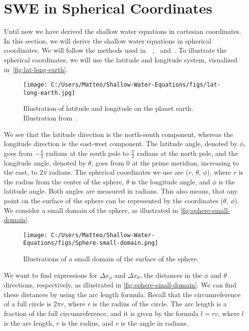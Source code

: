 \section{SWE in Spherical Coordinates}
Until now we have derived the shallow water equations in cartesian coordinates.
In this section, we will derive the shallow water equations in spherical coordinates.
We will follow the methods used in~\cite{Castro2017}~\cite{Bihlo2022},~\cite{Raymond} and~\cite{Gill_1982}.
To illustrate the spherical coordinates, we will use the latitude and longitude system, visualized in~\autoref{fig:lat-long-earth}.
\begin{figure}[H]
    \centering
    \texttt{[image: C:/Users/Matteo/Shallow-Water-Equations/figs/lat-long-earth.jpg]}
    \caption{Illustration of latitude and longitude on the planet earth.
    Illustration from~\cite{lat-long-earth}.}\label{fig:lat-long-earth}
\end{figure}
We see that the latitude direction is the north-south component, whereas the longitude direction is the east-west component.
The latitude angle, denoted by $\phi$, goes from $-\frac{\pi}{2}$ radians at the south pole to $\frac{\pi}{2}$ radians at the north pole, and the longitude angle, denoted by $\theta$, goes from $0$ at the prime meridian, increasing to the east, to $2\pi$ radians.
The spherical coordinates we use are ($r$, $\theta$, $\phi$), where $r$ is the radius from the center of the sphere, $\theta$ is the longitude angle, and $\phi$ is the latitude angle. Both angles are measured in radians.
This also means, that any point on the surface of the sphere can be represented by the coordinates ($\theta$, $\phi$).
We consider a small domain of the sphere, as illustrated in \autoref{fig:sphere-small-domain}.
\begin{figure}[H]
    \centering
    \texttt{[image: C:/Users/Matteo/Shallow-Water-Equations/figs/Sphere-small-domain.png]}
    \caption{Illustrations of a small domain of the surface of the sphere.}\label{fig:sphere-small-domain}
\end{figure}
We want to find expressions for $\Delta x_{\phi}$ and $\Delta x_{\theta}$, the distances in the $\phi$ and $\theta$ directions, respectively, as illustrated in \autoref{fig:sphere-small-domain}.
We can find these distances by using the arc length formula.
Recall that the circumreference of a full circle is $2\pi r$, where $r$ is the radius of the circle.
The arc length is a fraction of the full circumreference, and it is given by the formula $l = r v$, where $l$ is the arc length, $r$ is the radius, and $v$ is the angle in radians.
